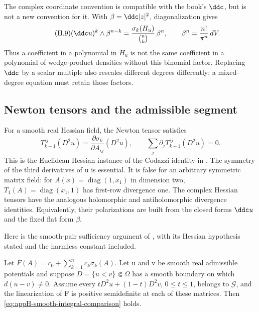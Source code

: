 The complex coordinate convention is compatible with the book's
\(\ddc\), but is not a new convention for it. With
\(\beta=\ddc|z|^2\), diagonalization gives
\[
 \tag{H.9}\label{eq:appH-coordinate-Hessian-form}
 (\ddc u)^k\wedge\beta^{n-k}
   =\frac{\sigma_k(H_u)}{\binom nk}\,\beta^n,
 \qquad \beta^n=\frac{n!}{\pi^n}\,dV.
\]
Thus a coefficient in a polynomial in \(H_u\) is not the same
coefficient in a polynomial of wedge-product densities without this
binomial factor. Replacing \(\ddc\) by a scalar multiple also rescales
different degrees differently; a mixed-degree equation must retain
those factors.

\subsection{Newton tensors and the admissible segment}
\label{sec:appH-Newton-segment}

For a smooth real Hessian field, the Newton tensor satisfies
\[
 \tag{H.10}\label{eq:appH-Hessian-Newton-divergence}
 T_{k-1}^{ij}(D^2u)
      =\frac{\partial\sigma_k}{\partial A_{ij}}(D^2u),
 \qquad \sum_j\partial_jT_{k-1}^{ij}(D^2u)=0.
\]
This is the Euclidean Hessian instance of the Codazzi identity in
\cite[Lemma~2.1, course-note pp.~5--6]{GuanCIMECourseNotes}.
The symmetry of the third derivatives of u is essential.
It is false for an arbitrary symmetric matrix field: for
\(A(x)=\operatorname{diag}(1,x_1)\) in dimension two,
\(T_1(A)=\operatorname{diag}(x_1,1)\) has first-row divergence one.
The complex Hessian tensors have the analogous holomorphic and
antiholomorphic divergence identities. Equivalently, their
polarizations are built from the closed forms \(\ddc u\) and
the fixed flat form \(\beta\).

Here is the smooth-pair sufficiency argument of
\cite[(3.2) and Remark~3.2]{DinewMygaSroka26IntegralV1}, with its
Hessian hypothesis stated and the harmless constant included.

\begin{proposition}\label{prop:appH-polynomial-smooth-comparison}
Let
\(F(A)=c_0+\sum_{k=1}^n c_k\sigma_k(A)\).
Let u and v be smooth real admissible potentials and suppose
\(D=\{u<v\}\Subset\Omega\) has a smooth boundary on which
\(d(u-v)\ne0\). Assume every
\(tD^2u+(1-t)D^2v\), \(0\leq t\leq1\), belongs to
\(\mathcal G\), and the linearization of F is positive semidefinite
at each of these matrices. Then
\eqref{eq:appH-smooth-integral-comparison} holds.
\end{proposition}

